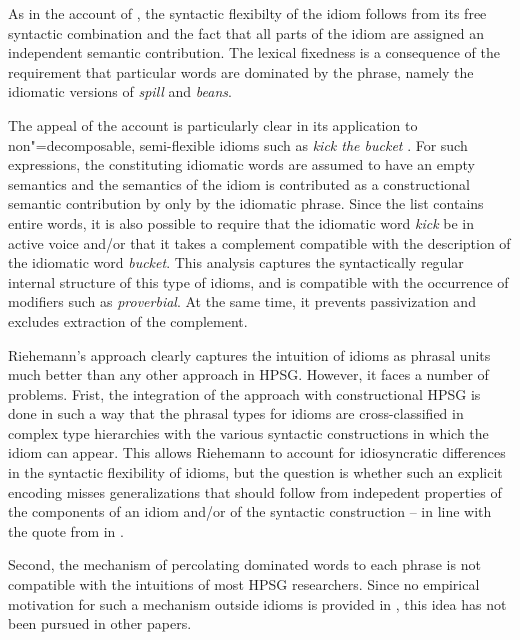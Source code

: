 \documentclass[output=paper]{langsci/langscibook}
\begin{document}
As in the account of \cite{KE94a}, the syntactic flexibilty of the idiom follows from its free syntactic combination and the fact that all parts of the idiom are assigned an independent semantic contribution. The lexical fixedness is a consequence of the requirement that particular words are dominated by the phrase, namely the idiomatic versions of \emph{spill} and \emph{beans}.

The appeal of the account is particularly clear in its application to non"=de\-com\-posable, semi-flexible idioms such as \emph{kick the bucket} \citep[]{Riehemann2001a}. 
For such expressions, the constituting idiomatic words are assumed to have an empty semantics and the semantics of the idiom is contributed as a constructional semantic contribution by only by the idiomatic phrase. 
Since the  list contains entire words, it is also possible to require that the idiomatic word \emph{kick} be in active voice and/or that it takes a complement compatible with the description of the idiomatic word \emph{bucket}.
This analysis captures the syntactically regular internal structure of this type of idioms, and is compatible with the occurrence of modifiers such as \emph{proverbial}. At the same time, it prevents passivization and excludes extraction of the complement.

Riehemann's approach clearly captures the intuition of idioms as phrasal units much better than any other approach in HPSG. 
However, it faces a number of problems.
Frist, the integration of the approach with constructional HPSG is done in such a way that the phrasal types for idioms are cross-classified in complex type hierarchies with the various syntactic constructions in which the idiom can appear. 
This allows Riehemann to account for idiosyncratic differences in the syntactic flexibility of idioms, but the question is whether such an explicit encoding misses generalizations that should follow from indepedent properties of the components of an idiom and/or of the syntactic construction -- in line with the quote from \cite{NSW94a} in .


Second, the mechanism of percolating dominated words to each phrase is not compatible with the intuitions of most HPSG researchers. 
Since no empirical motivation for such a mechanism outside idioms is provided in \cite{Riehemann2001a}, this idea has not been pursued in other papers. 
\end{document}
